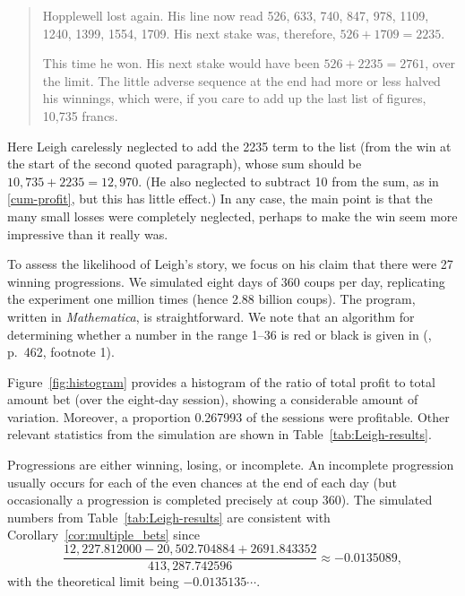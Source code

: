 \documentclass{article}
\theoremstyle{definition}
\theoremstyle{remark}
\begin{document}
\begin{quotation}
\noindent Hopplewell lost again. His line now read 526, 633, 740, 847, 978, 1109, 1240, 1399, 1554, 1709.  His next stake was, therefore, $526+1709=2235$.

This time he won.  His next stake would have been $526+2235=2761$, over the limit.  The little adverse sequence at the end had more or less halved his winnings, which were, if you care to add up the last list of figures, 10,735 francs.
\end{quotation}


Here Leigh carelessly neglected to add the 2235 term to the list (from the win at the start of the second quoted paragraph), whose sum should be $10{,}735+2235=12{,}970$.  (He also neglected to subtract 10 from the sum, as in \eqref{cum-profit}, but this has little effect.)  In any case, the main point is that the many small losses were completely neglected, perhaps to make the win seem more impressive than it really was.

To assess the likelihood of Leigh's story, we focus on his claim that there were 27 winning progressions.  We simulated eight days of 360 coups per day, replicating the experiment one million times (hence 2.88 billion coups).  The program, written in \textit{Mathematica}, is straightforward.  We note that an algorithm for determining whether a number in the range 1--36 is red or black is given in \citeauthor{E10} (\citeyear{E10}, p.~462, footnote 1).

Figure~\ref{fig:histogram}
provides a histogram of the ratio of total profit to total amount bet (over the eight-day session), showing a considerable amount of variation.  Moreover, a proportion 0.267993 of the sessions were profitable.  Other relevant statistics from the simulation are shown in Table~\ref{tab:Leigh-results}.

Progressions are either winning, losing, or incomplete.  An incomplete progression usually occurs for each of the even chances at the end of each day (but occasionally a progression is completed precisely at coup 360).  The simulated numbers from Table~\ref{tab:Leigh-results} are consistent with Corollary~\ref{cor:multiple_bets} since
\begin{equation}\label{consistency}
\frac{12{,}227.812000-20{,}502.704884+2691.843352}{413{,}287.742596}\approx-0.0135089,
\end{equation}
with the theoretical limit being $-0.0135135\cdots$. 
\end{document}
